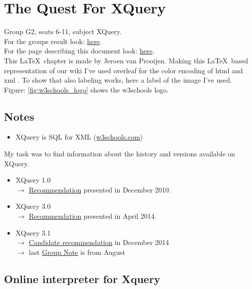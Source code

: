 \chapter{The Quest For XQuery}
Group G2, seats 6-11, subject XQuery.\\
For the groups result look: \href{https://www.os3.nl/2015-2016/students/jeroen_van_prooijen/es/week36/g2_exercise_xquery}{here}.\\
For the page describing this document look: \href{https://www.os3.nl/2015-2016/students/jeroen_van_prooijen/es/week36#group_assignmentxquery}{here}.\\

This \LaTeX\ chapter is made by Jeroen van Prooijen. Making this \LaTeX\ based representation of our wiki I've used overleaf for the color encoding of html and xml \cite{overleaf}.
To show that also labeling works, here a label of the image I've used. Figure: \ref{fig:w3schools_logo} shows the w3schools logo.

\section{Notes}
\begin{itemize}
\item XQuery is SQL for XML (\url{w3schools.com})
\end{itemize}

My task was to find information about the history and versions available on XQuery.

\begin{itemize}
\item XQuery 1.0 \hfill \\
$\rightarrow$ \href{http://www.w3.org/TR/xquery/}{Recommendation} presented in December 2010.
\item XQuery 3.0 \hfill \\
$\rightarrow$ \href{http://www.w3.org/TR/xquery-30/}{Recommendation} presented in April 2014.
\item XQuery 3.1 \hfill \\
$\rightarrow$ \href{http://www.w3.org/TR/xquery-3/}{Candidate recommendation} in December 2014 \\ 
$\rightarrow$ last \href{http://www.w3.org/TR/xquery-31-requirements/}{Group Note} is from August
\end{itemize}

\newpage

\section{Online interpreter for Xquery}

